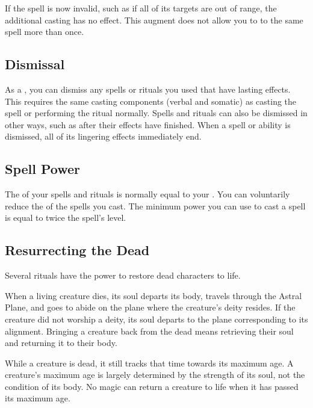             If the spell is now invalid, such as if all of its targets are out of range, the additional casting has no effect.
            This augment does not allow you to  to the same spell more than once.

    \subsection{Dismissal}
        As a , you can dismiss any spells or rituals you used that have lasting effects.
        This requires the same casting components (verbal and somatic) as casting the spell or performing the ritual normally.
        Spells and rituals can also be dismissed in other ways, such as after their effects have finished.
        When a spell or ability is dismissed, all of its lingering effects immediately end.

    \subsection{Spell Power}

        The  of your spells and rituals is normally equal to your .
        You can voluntarily reduce the  of the spells you cast.
        The minimum power you can use to cast a spell is equal to twice the spell's level.

    \subsection{Resurrecting the Dead}\label{Resurrecting the Dead}
        Several rituals have the power to restore dead characters to life.

        When a living creature dies, its soul departs its body, travels through the Astral Plane, and goes to abide on the plane where the creature's deity resides.
        If the creature did not worship a deity, its soul departs to the plane corresponding to its alignment.
        Bringing a creature back from the dead means retrieving their soul and returning it to their body.

         While a creature is dead, it still tracks that time towards its maximum age.
        A creature's maximum age is largely determined by the strength of its soul, not the condition of its body.
        No magic can return a creature to life when it has passed its maximum age.

